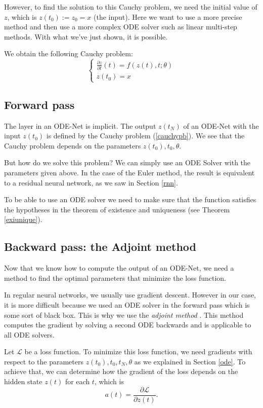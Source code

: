 \documentclass[10pt,a4paper]{article}
\theoremstyle{definition}
\theoremstyle{plain}
\begin{document}
However, to find the solution to this Cauchy problem, we need the initial value of $z$, which is $z(t_0) := z_0 = x$ (the input). Here we want to use a more precise method and then use a more complex ODE solver such as linear multi-step methods. With what we've just shown, it is possible.

We obtain the following Cauchy problem:
\begin{equation}
\label{cauchypb}
\begin{cases}
\frac{\partial z}{\partial t}(t) =  f(z(t), t; \theta) \\
z(t_0) =  x
\end{cases}
\end{equation}


\subsection{Forward pass}

The layer in an ODE-Net is implicit. The output $z(t_N)$ of an ODE-Net with the input $z(t_0)$ is defined by the Cauchy problem (\ref{cauchypb}). We see that the Cauchy problem depends on the parameters $z(t_0),t_0,\theta$.

But how do we solve this problem? We can simply use an ODE Solver with the parameters given above. In the case of the Euler method, the result is equivalent to a residual neural network, as we saw in Section \ref{rnn}.

To be able to use an ODE solver we need to make sure that the function satisfies the hypotheses in the theorem of existence and uniqueness (see Theorem \ref{exiunique}).

\subsection{Backward pass: the Adjoint method}
Now that we know how to compute the output of an ODE-Net, we need a method to find the optimal parameters that minimize the loss function.

In regular neural networks, we usually use gradient descent. However in our case, it is more difficult because we used an ODE solver in the forward pass which is some sort of black box. This is why we use the \textit{adjoint method} \cite{12}. This method computes the gradient by solving a second ODE backwards and is applicable to all ODE solvers.

Let $\mathcal{L}$ be a loss function. To minimize this loss function, we need gradients with respect to the parameters $z(t_0),t_0,t_N,\theta$ as we explained in Section \ref{ode}. To achieve that, we can determine how the gradient of the loss depends on the hidden state $z(t)$ for each $t$, which is
\begin{equation}
a(t)= \frac{\partial \mathcal{L}}{\partial z(t)}.
\end{equation}
\end{document}
